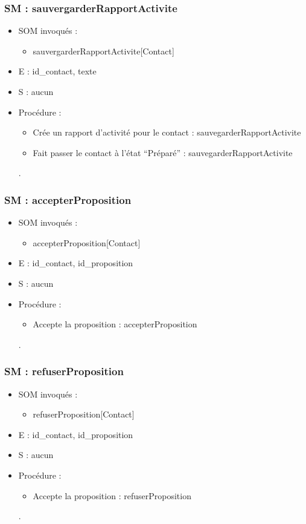 \subsubsection{SM : sauvergarderRapportActivite}
\begin{itemize}
	\item SOM invoqués :
	\begin{itemize}
		\item sauvergarderRapportActivite[Contact]
	\end{itemize}
	\item E : id\_contact, texte
	\item S : aucun
	\item Procédure :
	\begin{itemize}
		\item Crée un rapport d’activité pour le contact :
	sauvegarderRapportActivite
		\item Fait passer le contact à l’état “Préparé” : sauvegarderRapportActivite
	\end{itemize}.
\end{itemize}

\subsubsection{SM : accepterProposition}
\begin{itemize}
	\item SOM invoqués :
	\begin{itemize}
		\item accepterProposition[Contact]
	\end{itemize}
	\item E : id\_contact, id\_proposition
	\item S : aucun
	\item Procédure :
	\begin{itemize}
		\item Accepte la proposition : accepterProposition
	\end{itemize}.
\end{itemize}

\subsubsection{SM : refuserProposition}
\begin{itemize}
	\item SOM invoqués :
	\begin{itemize}
		\item refuserProposition[Contact]
	\end{itemize}
	\item E : id\_contact, id\_proposition
	\item S : aucun
	\item Procédure :
	\begin{itemize}
		\item Accepte la proposition : refuserProposition
	\end{itemize}.
\end{itemize}

